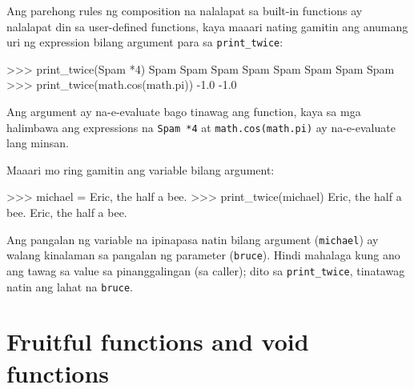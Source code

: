 \documentclass[10pt,]{book}
\newenvironment{Shaded}{}{}
\newcommand{\DecValTok}[1]{\textcolor[rgb]{0.25,0.63,0.44}{#1}}
\newcommand{\FloatTok}[1]{\textcolor[rgb]{0.25,0.63,0.44}{#1}}
\newcommand{\NormalTok}[1]{#1}
\newcommand{\OperatorTok}[1]{\textcolor[rgb]{0.40,0.40,0.40}{#1}}
\newcommand{\StringTok}[1]{\textcolor[rgb]{0.25,0.44,0.63}{#1}}
\begin{document}
Ang parehong rules ng composition na nalalapat sa built-in functions ay
nalalapat din sa user-defined functions, kaya maaari nating gamitin ang
anumang uri ng expression bilang argument para sa \texttt{print\_twice}:


\begin{Shaded}
\begin{Highlighting}[]
\OperatorTok{\textgreater{}\textgreater{}\textgreater{}}\NormalTok{ print\_twice(}\StringTok{\textquotesingle{}Spam \textquotesingle{}}\OperatorTok{*}\DecValTok{4}\NormalTok{)}
\NormalTok{Spam Spam Spam Spam}
\NormalTok{Spam Spam Spam Spam}
\OperatorTok{\textgreater{}\textgreater{}\textgreater{}}\NormalTok{ print\_twice(math.cos(math.pi))}
\OperatorTok{{-}}\FloatTok{1.0}
\OperatorTok{{-}}\FloatTok{1.0}
\end{Highlighting}
\end{Shaded}

Ang argument ay na-e-evaluate bago tinawag ang function, kaya sa mga
halimbawa ang expressions na
\texttt{\textquotesingle{}Spam\ \textquotesingle{}*4} at
\texttt{math.cos(math.pi)} ay na-e-evaluate lang minsan.


Maaari mo ring gamitin ang variable bilang argument:

\begin{Shaded}
\begin{Highlighting}[]
\OperatorTok{\textgreater{}\textgreater{}\textgreater{}}\NormalTok{ michael }\OperatorTok{=} \StringTok{\textquotesingle{}Eric, the half a bee.\textquotesingle{}}
\OperatorTok{\textgreater{}\textgreater{}\textgreater{}}\NormalTok{ print\_twice(michael)}
\NormalTok{Eric, the half a bee.}
\NormalTok{Eric, the half a bee.}
\end{Highlighting}
\end{Shaded}

Ang pangalan ng variable na ipinapasa natin bilang argument
(\texttt{michael}) ay walang kinalaman sa pangalan ng parameter
(\texttt{bruce}). Hindi mahalaga kung ano ang tawag sa value sa
pinanggalingan (sa caller); dito sa \texttt{print\_twice}, tinatawag
natin ang lahat na \texttt{bruce}.

\section{Fruitful functions and void
functions}\label{fruitful-functions-and-void-functions}
\end{document}
